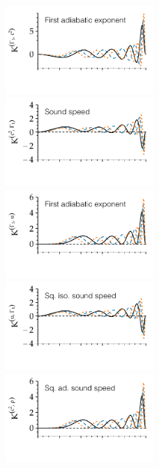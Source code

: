 \begin{figure}
    \centering
    \includegraphics[width=0.5\textwidth,trim={0 1.1cm 0 0}, clip]{figs/pulse/kernels/kernel-n-Gamma1_c2-diffusion.pdf}%
    \includegraphics[width=0.5\textwidth,trim={0 1.1cm 0 0}, clip]{figs/pulse/kernels/kernel-n-c2_Gamma1-diffusion.pdf}\\
    \includegraphics[width=0.5\textwidth,trim={0 1.1cm 0 0}, clip]{figs/pulse/kernels/kernel-n-Gamma1_u-diffusion.pdf}%
    \includegraphics[width=0.5\textwidth,trim={0 1.1cm 0 0}, clip]{figs/pulse/kernels/kernel-n-u_Gamma1-diffusion.pdf}\\
    \includegraphics[width=0.5\textwidth,trim={0 1.1cm 0 0}, clip]{figs/pulse/kernels/kernel-n-c2_rho-diffusion.pdf}%

\end{figure}
